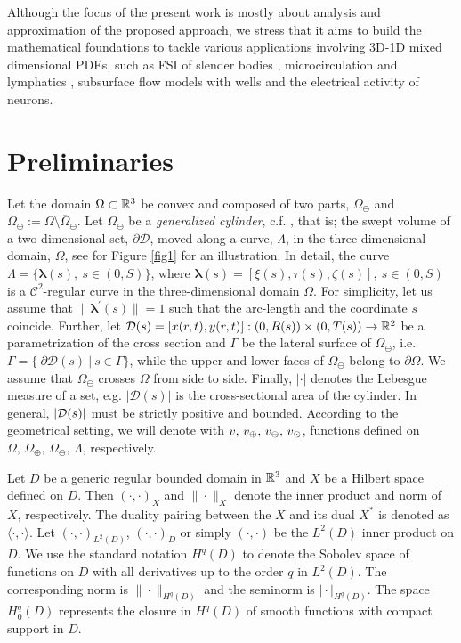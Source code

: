 \documentclass[r]{siamart171218}
\newcommand{\paolo}[1]{{\color{magenta}#1}}
\begin{document}
\paolo{Although the focus of the present work is mostly about analysis and approximation of the proposed approach, we stress that it aims to build the mathematical foundations to tackle various applications involving 3D-1D mixed dimensional PDEs, such as FSI of slender bodies \cite{Mori2019887}, microcirculation and lymphatics \cite{Possenti2019101,Vinje2019}, subsurface flow models with wells \cite{Cerroni2019} and the electrical activity of neurons.}

\section{Preliminaries}\label{sec:setting}

Let the domain $\Omega\subset \mathbb{R}^3 $ be convex and composed of two parts, 
$\Omega_{\ominus}$ and $\Omega_{\oplus}:=\Omega\setminus\overline{\Omega}_{\ominus}$. 
Let 
$\Omega_{\ominus}$ be a \emph{generalized cylinder}, c.f.  \cite{MR1940257}, 
that is; the swept volume of a two dimensional set, $\partial\mathcal{D}$, moved along a curve, $\Lambda$, in the three-dimensional domain, $\Omega$, see for Figure \ref{fig1} for an illustration. 
In detail, the curve 
$\Lambda = \{\boldsymbol \lambda(s), \ s\in(0,S)\}$,  where 
$\boldsymbol \lambda(s) = [\xi(s), \tau(s), \zeta(s)], \ s\in(0,S)$ is a $\mathcal{C}^2$-regular curve in the three-dimensional domain $\Omega$.
For simplicity, let us assume that $\|\boldsymbol \lambda^\prime(s)\|=1$ such that the arc-length and the coordinate $s$ coincide.
Further, let $\mathcal{D}(s) = [x(r,t),y(r,t)]: (0,R(s))\times(0,T(s)) \rightarrow \mathbb{R}^2$ be a parametrization of the cross section
and $\Gamma$ be the lateral surface of $\Omega_{\ominus}$, i.e.
$\Gamma=\{ \ \partial \mathcal{D}(s) \  | \ s \in \Gamma\}$,
while the upper and lower faces of $\Omega_{\ominus}$ belong to $\partial\Omega$. 
We assume that $\Omega_{\ominus}$ crosses $\Omega$ from side to side.
 \paolo{Finally, $|\cdot|$ denotes the Lebesgue measure of a set, e.g. $|\mathcal{D}(s)|$ is the cross-sectional area of the cylinder. In general, $|\mathcal{D}(s)|$ must be strictly positive and bounded.}
According to the geometrical setting, we will denote with $v,\,v_\oplus,\,v_\ominus,\,v_{\odot}$,
functions defined on $\Omega,\,\Omega_{\oplus},\,\Omega_{\ominus},\,\Lambda$, respectively.

Let $D$ be a generic regular bounded domain in $\mathbb{R}^3$ and $X$ be a Hilbert space defined on $D$. Then  $(\cdot,\cdot)_X$ and $\|\cdot\|_X$ denote the inner product and norm of $X$, respectively.
The duality pairing between the $X$ and its dual $X^*$ is denoted as $\langle\cdot,\cdot\rangle$.
Let $(\cdot,\cdot)_{L^2(D)}$,  $(\cdot,\cdot)_D$ or simply $(\cdot,\cdot)$ be the $L^2(D)$ inner product on $D$.
We use the standard notation $H^q(D)$ to denote the Sobolev space of functions on $D$ with all derivatives up to the order $q$ in $L^2(D)$.
The corresponding norm is $\|\cdot\|_{H^q(D)}$ and the seminorm is $\vert\cdot\vert_{H^q(D)}$.
The space $H^q_0(D)$ represents the closure in $H^q(D)$ of smooth functions with compact support in $D$.
\end{document}
